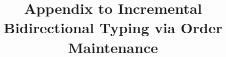 \documentclass[acmsmall,dvipsnames,10pt,review,nonacm,anonymous]{acmart}\settopmatter{printfolios=true}
\begin{document}
\title{Appendix to Incremental Bidirectional Typing via Order Maintenance}
\appendix

\maketitle

\end{document}

